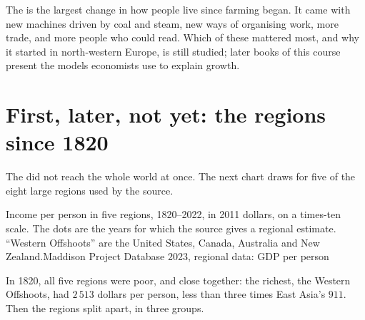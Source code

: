 The  is the largest change in how people live since farming began. It
came with new machines driven by coal and steam, new ways of organising work,
more trade, and more people who could read. Which of these mattered most, and
why it started in north-western Europe, is still studied; later books of this
course present the models economists use to explain growth.

\section{First, later, not yet: the regions since 1820}

The  did not reach the whole world at once. The next chart draws
 for five of the eight large regions used by the source.

\begin{omchart}{Income per person in five regions, 1820--2022, in 2011 dollars, on
a times-ten scale. The dots are the years for which the source gives a regional
estimate. ``Western Offshoots'' are the United States, Canada, Australia and New
Zealand.}{Maddison Project Database 2023, regional data: GDP per person}
\end{omchart}

In 1820, all five regions were poor, and close together: the richest, the
Western Offshoots, had $2\,513$ dollars per person, less than three times East
Asia's $911$. Then the regions split apart, in three groups.

